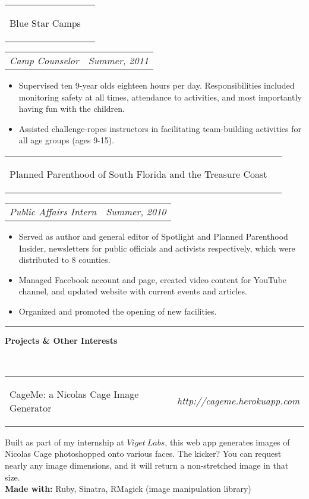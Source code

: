 \documentclass[11pt]{article}
\makeatletter
\newcommand{\headerrow}[2]
{\begin{tabular*}{\linewidth}{l@{\extracolsep{\fill}}r}
	#1 &
	#2 \\
\end{tabular*}}
\makeatother
\begin{document}
	\headerrow
		{\begin{Large}Blue Star Camps\end{Large}}
		{}
	\headerrow
		{\textit{Camp Counselor}}
		{\textit{Summer, 2011}}
	\begin{itemize}
		\item Supervised ten 9-year olds eighteen hours per day. Responsibilities included monitoring safety at all times,
attendance to activities, and most importantly having fun with the children.
		\vspace{-0.8em}
		\item Assisted challenge-ropes instructors in facilitating team-building activities for all age groups (ages 9-15).
	\end{itemize}
	
	\headerrow
		{\begin{Large}Planned Parenthood of South Florida and the Treasure Coast
\end{Large}}
		{}
	\headerrow
		{\textit{Public Affairs Intern}}
		{\textit{Summer, 2010}}
	\begin{itemize}
		\item Served as author and general editor of Spotlight and Planned Parenthood Insider, newsletters for public
officials and activists respectively, which were distributed to 8 counties.
		\vspace{-0.8em}
		\item Managed Facebook account and page, created video content for YouTube channel, and updated website with current events and articles.
		\vspace{-0.8em}
		\item Organized and promoted the opening of new facilities.
	\end{itemize}
\hrule
\vspace{0.5em}

\begin{LARGE}
	\bf Projects \& Other Interests
\end{LARGE} 
\vspace{0.5em} \\
\headerrow
	{\begin{Large}CageMe: a Nicolas Cage Image Generator\end{Large}}
	{\textit{http://cageme.herokuapp.com}}
	\begin{normalsize}
	\hspace*{1.5em}Built as part of my internship at $Viget\ Labs$, this web app generates images of Nicolas Cage photoshopped onto various faces. The kicker? You can request nearly any image dimensions, and it will return a non-stretched image in that size. \\
	{\bf Made with:} Ruby, Sinatra, RMagick (image manipulation library)
	\end{normalsize} \\
\end{document}
